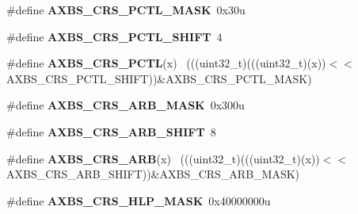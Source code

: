 \begin{DoxyCompactItemize}
\item 
\hypertarget{group___a_x_b_s___register___masks_gae9582bf93b9b0b8fa349ebb7e61ca312}{}\#define {\bfseries A\+X\+B\+S\+\_\+\+C\+R\+S\+\_\+\+P\+C\+T\+L\+\_\+\+M\+A\+S\+K}~0x30u\label{group___a_x_b_s___register___masks_gae9582bf93b9b0b8fa349ebb7e61ca312}

\item 
\hypertarget{group___a_x_b_s___register___masks_ga010aca7f5f083633f9a2e1eb1e9e02e3}{}\#define {\bfseries A\+X\+B\+S\+\_\+\+C\+R\+S\+\_\+\+P\+C\+T\+L\+\_\+\+S\+H\+I\+F\+T}~4\label{group___a_x_b_s___register___masks_ga010aca7f5f083633f9a2e1eb1e9e02e3}

\item 
\hypertarget{group___a_x_b_s___register___masks_ga82984c98d52f5cbd1335883070044a4e}{}\#define {\bfseries A\+X\+B\+S\+\_\+\+C\+R\+S\+\_\+\+P\+C\+T\+L}(x)                                              ~(((uint32\+\_\+t)(((uint32\+\_\+t)(x))$<$$<$A\+X\+B\+S\+\_\+\+C\+R\+S\+\_\+\+P\+C\+T\+L\+\_\+\+S\+H\+I\+F\+T))\&A\+X\+B\+S\+\_\+\+C\+R\+S\+\_\+\+P\+C\+T\+L\+\_\+\+M\+A\+S\+K)\label{group___a_x_b_s___register___masks_ga82984c98d52f5cbd1335883070044a4e}

\item 
\hypertarget{group___a_x_b_s___register___masks_ga18bef8f761d00bf46b543a96adb7eae3}{}\#define {\bfseries A\+X\+B\+S\+\_\+\+C\+R\+S\+\_\+\+A\+R\+B\+\_\+\+M\+A\+S\+K}~0x300u\label{group___a_x_b_s___register___masks_ga18bef8f761d00bf46b543a96adb7eae3}

\item 
\hypertarget{group___a_x_b_s___register___masks_ga1b37d1aff0c53735798f6de4ead2cf16}{}\#define {\bfseries A\+X\+B\+S\+\_\+\+C\+R\+S\+\_\+\+A\+R\+B\+\_\+\+S\+H\+I\+F\+T}~8\label{group___a_x_b_s___register___masks_ga1b37d1aff0c53735798f6de4ead2cf16}

\item 
\hypertarget{group___a_x_b_s___register___masks_ga431c09a03395c796da286f1642490e86}{}\#define {\bfseries A\+X\+B\+S\+\_\+\+C\+R\+S\+\_\+\+A\+R\+B}(x)                                                ~(((uint32\+\_\+t)(((uint32\+\_\+t)(x))$<$$<$A\+X\+B\+S\+\_\+\+C\+R\+S\+\_\+\+A\+R\+B\+\_\+\+S\+H\+I\+F\+T))\&A\+X\+B\+S\+\_\+\+C\+R\+S\+\_\+\+A\+R\+B\+\_\+\+M\+A\+S\+K)\label{group___a_x_b_s___register___masks_ga431c09a03395c796da286f1642490e86}

\item 
\hypertarget{group___a_x_b_s___register___masks_gab93f8320945abd915c31020d4d147d33}{}\#define {\bfseries A\+X\+B\+S\+\_\+\+C\+R\+S\+\_\+\+H\+L\+P\+\_\+\+M\+A\+S\+K}~0x40000000u\label{group___a_x_b_s___register___masks_gab93f8320945abd915c31020d4d147d33}


\end{DoxyCompactItemize}
